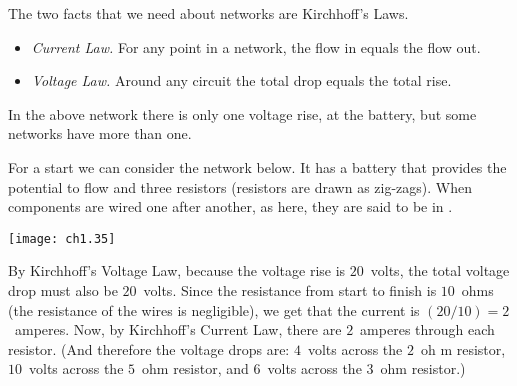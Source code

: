 The two facts that we need about networks are Kirchhoff's
Laws. 
\begin{itemize}
  \item[] \textit{Current Law.} For any point in a network, the flow in
     equals the flow out.
  \item[] \textit{Voltage Law.} Around any circuit the total drop equals 
     the total rise.
\end{itemize}
In the above network there is only one voltage rise, at the battery, but
some networks have more than one.

For a start we can consider the network below.
It has a battery that provides the potential to flow 
and three resistors
(resistors are drawn as zig-zags).
When components are wired one after another, as here,
they are said to be in .
\begin{center}
  \texttt{[image: ch1.35]}
\end{center}
By Kirchhoff's Voltage Law, because the voltage rise is
$20$~volts, the total voltage drop must also be $20$~volts.
Since the resistance from start to finish is
$10$~ohms (the resistance of the wires is negligible),
we get that the current is $(20/10)=2$~amperes. 
Now, by Kirchhoff's Current Law, there are $2$~amperes through
each resistor.
(And therefore the voltage drops are: 
$4$~volts across the $2$~oh m resistor,
$10$~volts across the $5$~ohm resistor, 
and $6$~volts across the $3$~ohm resistor.)

